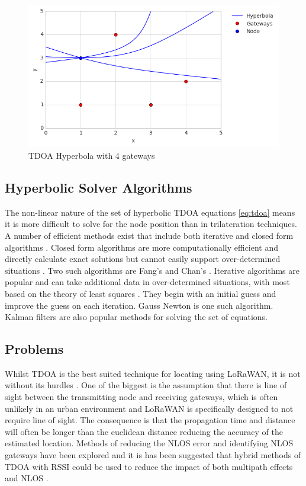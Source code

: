 \documentclass[a4paper]{report}
\begin{document}
      \begin{figure}[ht]
      \centering
      \includegraphics[width=12cm]{figures/TDOA.png}
      \caption{TDOA Hyperbola with 4 gateways}
      \label{fig:tdoa}
      \end{figure}

    \subsection{Hyperbolic Solver Algorithms}
      The non-linear nature of the set of hyperbolic TDOA equations \ref{eq:tdoa} means it is more difficult to solve for the node position than in trilateration techniques. A number of efficient methods exist that include both iterative and closed form algorithms \cite{ElGemayel2013}. Closed form algorithms are more computationally efficient and directly calculate exact solutions but cannot easily support over-determined situations \cite{Li2011}. Two such algorithms are Fang's \cite{Aatique1997} and Chan's \cite{Chan1994}. Iterative algorithms are popular and can take additional data in over-determined situations, with most based on the theory of least squares \cite{Koks2007}. They begin with an initial guess and improve the guess on each iteration. Gauss Newton is one such algorithm. Kalman filters are also popular methods for solving the set of equations.

    \subsection{Problems}
      Whilst TDOA is the best suited technique for locating using LoRaWAN, it is not without its hurdles \cite{LinkLabs}. One of the biggest is the assumption that there is line of sight between the transmitting node and receiving gateways, which is often unlikely in an urban environment and LoRaWAN is specifically designed to not require line of sight. The consequence is that the propagation time and distance will often be longer than the euclidean distance reducing the accuracy of the estimated location. Methods of reducing the NLOS error and identifying NLOS gateways have been explored \cite{Cong2001} and it is has been suggested that hybrid methods of TDOA with RSSI could be used to reduce the impact of both multipath effects and NLOS \cite{Lategahn2013}\cite{ElGemayel2013a}.
\end{document}
